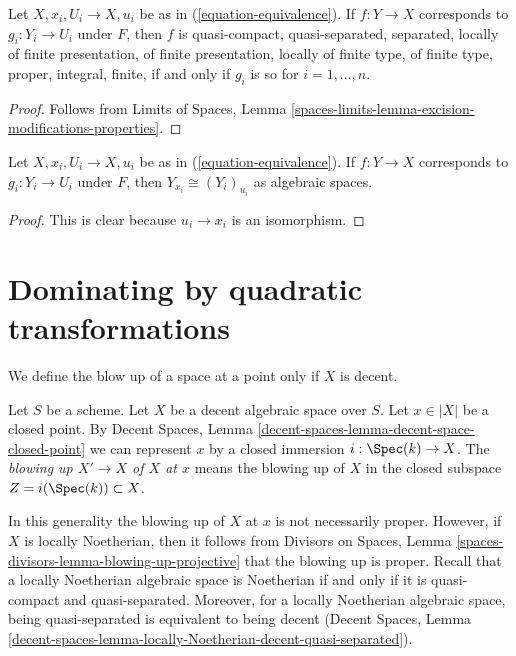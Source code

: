 \begin{lemma}
\label{lemma-equivalence-properties}
Let $X, x_i, U_i \to X, u_i$ be as in (\ref{equation-equivalence}).
If $f : Y \to X$ corresponds to $g_i : Y_i \to U_i$ under $F$,
then $f$ is quasi-compact, quasi-separated, separated, locally of finite
presentation, of finite presentation, locally of finite type, of finite type,
proper, integral, finite, if and only if $g_i$ is so
for $i = 1, \ldots, n$.
\end{lemma}

\begin{proof}
Follows from Limits of Spaces, Lemma
\ref{spaces-limits-lemma-excision-modifications-properties}.
\end{proof}

\begin{lemma}
\label{lemma-equivalence-fibre}
Let $X, x_i, U_i \to X, u_i$ be as in (\ref{equation-equivalence}).
If $f : Y \to X$ corresponds to $g_i : Y_i \to U_i$ under $F$,
then $Y_{x_i} \cong (Y_i)_{u_i}$ as algebraic spaces.
\end{lemma}

\begin{proof}
This is clear because $u_i \to x_i$ is an isomorphism.
\end{proof}







\section{Dominating by quadratic transformations}
\label{section-quadratic-spaces}

\noindent
We define the blow up of a space at a point only if $X$ is decent.

\begin{definition}
\label{definition-blowup-at-point}
Let $S$ be a scheme. Let $X$ be a decent algebraic space over $S$.
Let $x \in |X|$ be a closed point. By
Decent Spaces, Lemma \ref{decent-spaces-lemma-decent-space-closed-point}
we can represent $x$ by a closed immersion $i : \Spec(k) \to X$.
The {\it blowing up $X' \to X$ of $X$ at $x$} means the blowing up of $X$
in the closed subspace $Z = i(\Spec(k)) \subset X$.
\end{definition}

\noindent
In this generality the blowing up of $X$ at $x$ is not necessarily proper.
However, if $X$ is locally Noetherian, then it follows from
Divisors on Spaces, Lemma \ref{spaces-divisors-lemma-blowing-up-projective}
that the blowing up is proper.
Recall that a locally Noetherian algebraic space is Noetherian if
and only if it is quasi-compact and quasi-separated. Moreover, for
a locally Noetherian algebraic space, being quasi-separated is
equivalent to being decent (Decent Spaces, Lemma
\ref{decent-spaces-lemma-locally-Noetherian-decent-quasi-separated}).


